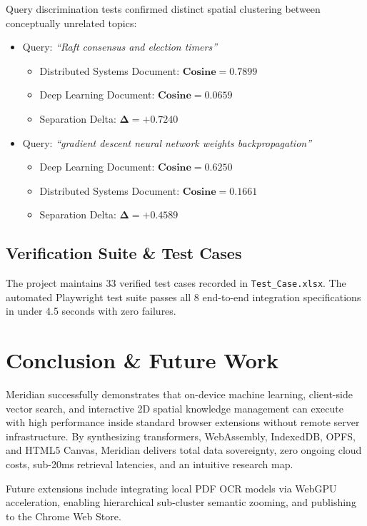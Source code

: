 \documentclass{tietreport}
\begin{document}
Query discrimination tests confirmed distinct spatial clustering between conceptually unrelated topics:
\begin{itemize}
    \item Query: \textit{``Raft consensus and election timers''}
    \begin{itemize}
        \item Distributed Systems Document: $\mathbf{\text{Cosine} = 0.7899}$
        \item Deep Learning Document: $\mathbf{\text{Cosine} = 0.0659}$
        \item Separation Delta: $\mathbf{\Delta = +0.7240}$
    \end{itemize}
    \item Query: \textit{``gradient descent neural network weights backpropagation''}
    \begin{itemize}
        \item Deep Learning Document: $\mathbf{\text{Cosine} = 0.6250}$
        \item Distributed Systems Document: $\mathbf{\text{Cosine} = 0.1661}$
        \item Separation Delta: $\mathbf{\Delta = +0.4589}$
    \end{itemize}
\end{itemize}

\section{Verification Suite \& Test Cases}

The project maintains 33 verified test cases recorded in \texttt{Test\_Case.xlsx}. The automated Playwright test suite passes all 8 end-to-end integration specifications in under 4.5 seconds with zero failures.


\chapter{Conclusion \& Future Work}

Meridian successfully demonstrates that on-device machine learning, client-side vector search, and interactive 2D spatial knowledge management can execute with high performance inside standard browser extensions without remote server infrastructure. By synthesizing transformers, WebAssembly, IndexedDB, OPFS, and HTML5 Canvas, Meridian delivers total data sovereignty, zero ongoing cloud costs, sub-20ms retrieval latencies, and an intuitive research map.

Future extensions include integrating local PDF OCR models via WebGPU acceleration, enabling hierarchical sub-cluster semantic zooming, and publishing to the Chrome Web Store.

\printbibliography
\end{document}
